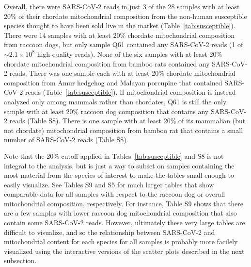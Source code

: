 \documentclass[9pt,twocolumn,twoside]{gsajnl_modified}
\begin{document}
 Overall, there were SARS-CoV-2 reads in just 3 of the 28 samples with at least 20\% of their chordate mitochondrial composition from the non-human susceptible species thought to have been sold live in the market (Table~\ref{tab:susceptible}).
There were 14 samples with at least 20\% chordate mitochondrial composition from raccoon dogs, but only sample Q61 contained any SARS-CoV-2 reads (1 of $\sim2.1 \times 10^8$ high-quality reads).
None of the six samples with at least 20\% chordate mitochondrial composition from bamboo rats contained any SARS-CoV-2 reads.
There was one sample each with at least 20\% chordate mitochondrial composition from Amur hedgehog and Malayan porcupine that contained SARS-CoV-2 reads (Table~\ref{tab:susceptible}).
If mitochondrial composition is instead analyzed only among mammals rather than chordates, Q61 is still the only sample with at least 20\% raccoon dog composition that contains any SARS-CoV-2 reads (Table S8).
There is one sample with at least 20\% of its mammalian (but not chordate) mitochondrial composition from bamboo rat that contains a small number of SARS-CoV-2 reads (Table S8).

Note that the 20\% cutoff applied in Tables~\ref{tab:susceptible} and S8 is not integral to the analysis, but is just a way to subset on samples containing the most material from the species of interest to make the tables small enough to easily visualize.
See Tables S9 and S5 for much larger tables that show comparable data for all samples with respect to the raccoon dog or overall mitochondrial composition, respectively.
For instance, Table S9 shows that there are a few samples with lower raccoon dog mitochondrial composition that also contain some SARS-CoV-2 reads.
However, ultimately these very large tables are difficult to visualize, and so the relationship between SARS-CoV-2 and mitochondrial content for each species for all samples is probably more facilely visualized using the interactive versions of the scatter plots described in the next subsection.
\end{document}
